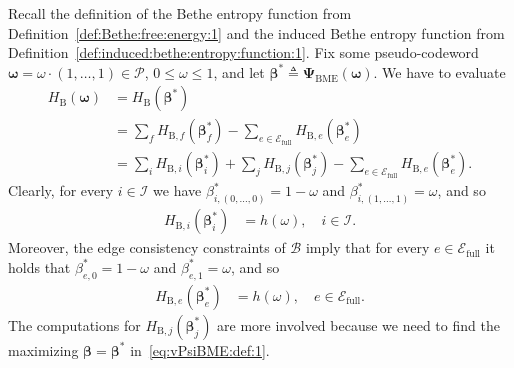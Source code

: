 \documentclass[journal, twocolumn]{IEEEtran}
\renewcommand{\leq}{\leqslant}
\newcommand{\set}[1]{\mathcal{#1}}
\newcommand{\defeq}{\triangleq}
\newcommand{\bel}{\beta}
\newcommand{\bels}{\bel^{*}}
\newcommand{\vbel}{\boldsymbol{\bel}}
\newcommand{\vbels}{\boldsymbol{\bel}^{*}}
\newcommand{\setEfull}{\set{E}_{\mathrm{full}}}
\newcommand{\setI}{\set{I}}
\newcommand{\vomega}{\boldsymbol{\omega}}
\newcommand{\fp}[1]{\mathcal{#1}}
\newcommand{\lmpB}{\mathcal{B}}
\newcommand{\HBethe}{H_{\mathrm{B}}}
\newcommand{\HBethesub}[1]{H_{\mathrm{B},#1}}
\newcommand{\?}{\mathrm{?}}
\newcommand{\vPsiBME}{\boldsymbol{\Psi}_{\mathrm{BME}}}
\begin{document}
Recall the definition of the Bethe entropy function from
Definition~\ref{def:Bethe:free:energy:1} and the induced Bethe entropy
function from Definition~\ref{def:induced:bethe:entropy:function:1}. Fix some
pseudo-codeword $\vomega = \omega \cdot (1, \ldots, 1) \in \fp{P}$, $0 \leq
\omega \leq 1$, and let $\vbels \defeq \vPsiBME(\vomega)$. We have to evaluate
\begin{align*}
  \HBethe(\vomega)
    &= \HBethe(\vbels) \\
    &= \sum_f
         \HBethesub{f}(\vbels_f)
       -
       \sum_{e \in \setEfull}
         \HBethesub{e}(\vbels_e) \\
    &= \sum_i
         \HBethesub{i}(\vbels_i)
       +
       \sum_j
         \HBethesub{j}(\vbels_j)
       -
       \sum_{e \in \setEfull}
         \HBethesub{e}(\vbels_e).
\end{align*}
Clearly, for every $i \in \setI$ we have $\bels_{i,(0,\ldots,0)} = 1 - \omega$ and
$\bels_{i,(1,\ldots,1)} = \omega$, and so
\begin{align}
  \HBethesub{i}(\vbels_i)
    &= h(\omega),
         \quad i \in \setI.
           \label{eq:Bethe:entropy:value:i:1}
\end{align}
Moreover, the edge consistency constraints of $\lmpB$ imply that for every $e
\in \setEfull$ it holds that $\bels_{e,0} = 1 - \omega$ and $\bels_{e,1} =
\omega$, and so
\begin{align}
  \HBethesub{e}(\vbels_e)
    &= h(\omega),
         \quad e \in \setEfull.
           \label{eq:Bethe:entropy:value:e:1}
\end{align}
The computations for $\HBethesub{j}(\vbels_j)$ are more involved because we
need to find the maximizing $\vbel = \vbels$ in~\eqref{eq:vPsiBME:def:1}.
\end{document}
